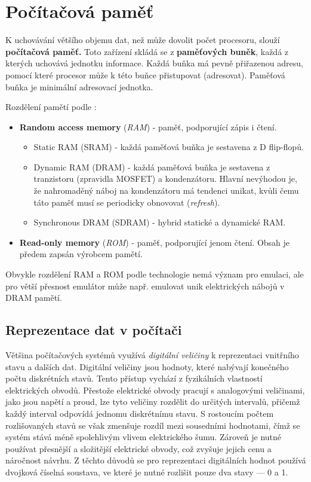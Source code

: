 \chapter{Počítačová paměť}

K uchovávání většího objemu dat, než může dovolit počet procesoru, slouží \textbf{počítačová paměť.}
Toto zařízení skládá se z \textbf{paměťových buněk}, každá z kterých uchovává jednotku informace.
Každá buňka má pevně přiřazenou adresu, pomocí které procesor může k této buňce přistupovat
(adresovat). Paměťová buňka je minimální adresovací jednotka.

Rozdělení pamětí podle :

\begin{itemize}
    \item \textbf{Random access memory} (\textit{RAM}) - paměť, podporující zápis i čtení.
        \begin{itemize}
            \item Static RAM (SRAM) - každá paměťová buňka je sestavena z D flip-flopů.
            \item Dynamic RAM (DRAM) - každá paměťová buňka je sestavena z tranzistoru (zpravidla
                MOSFET) a kondenzátoru. Hlavní nevýhodou je, že nahromaděný náboj na kondenzátoru má
            tendenci unikat, kvůli čemu táto paměť musí se periodicky obnovovat (\textit{refresh}).
            \item Synchronous DRAM (SDRAM) - hybrid statické a dynamické RAM.
        \end{itemize}
    \item \textbf{Read-only memory} (\textit{ROM}) - paměť, podporující jenom čtení. Obsah je
        předem zapsán výrobcem pamětí.
\end{itemize}

Obvykle rozdělení RAM a ROM podle technologie nemá význam pro emulaci, ale pro větší přesnost
emulátor může např. emulovat  unik elektrických nábojů v DRAM pamětí.

\section{Reprezentace dat v počítači}

Většina počítačových systémů využívá \emph{digitální veličiny} k reprezentaci vnitřního stavu a dalších
dat. Digitální veličiny jsou hodnoty, které nabývají konečného počtu diskrétních stavů. Tento přístup
vychází z fyzikálních vlastností elektrických obvodů. Přestože elektrické obvody pracují s
analogovými veličinami, jako jsou napětí a proud, lze tyto veličiny rozdělit do určitých intervalů,
přičemž každý interval odpovídá jednomu diskrétnímu stavu. S rostoucím počtem rozlišovaných stavů
se však zmenšuje rozdíl mezi sousedními hodnotami, čímž se systém stává méně spolehlivým vlivem
elektrického šumu. Zároveň je nutné používat přesnější a složitější elektrické obvody, což zvyšuje
jejich cenu a náročnost návrhu. Z těchto důvodů se pro reprezentaci digitálních hodnot používá
dvojková číselná soustava, ve které je nutné rozlišit pouze dva stavy — 0 a 1.

